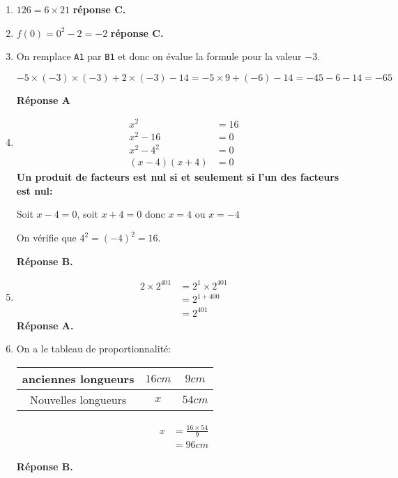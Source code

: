 
\begin{enumerate}
	\item  $126 = 6 \times 21$ \textbf{réponse C.}
	
	
	\item $f(0) = 0^2 - 2= - 2$ \textbf{réponse C.}
	
	\item On remplace \texttt{A1} par \texttt{B1} et donc on évalue la formule pour la valeur $ -3$.
	
	$-5\times (-3) \times (-3)+2 \times (-3)-14=-5 \times 9+(-6)-14=- 45 - 6-14=-65$
	
	\textbf{Réponse A}
	
	\item \begin{align*}
	x^2&=16\\
	x^2-16&=0\\
	x^2-4^2&=0\\
	(x-4)(x+4)&=0
	\end{align*}
	\textbf{Un produit de facteurs est nul si et seulement si l'un des facteurs est nul:}
	
	Soit $x-4=0$, soit $x+4=0$ donc $x=4$ ou $x=-4$
	
	On vérifie que $4^2=(-4)^2=16$.
	
	\textbf{Réponse B.}
	
	\item \begin{align*}
	2 \times 2^401&=2^1 \times 2^401\\
	&=2^{1+400}\\
	&=2^{401}
	\end{align*}
	\textbf{Réponse A.}
	
	\item 
	\begin{minipage}{0.5 \linewidth}
	On a le tableau de proportionnalité:
	
	\begin{tabular}{|c|c|c|}
	\hline 
	anciennes longueurs & $16 cm$ & $9 cm$ \\ 
	\hline 
	Nouvelles longueurs & $x$ & $54cm$ \\ 
	\hline 
	\end{tabular} 
	\end{minipage}
	\begin{minipage}{0.5 \linewidth}
	\begin{align*}
	x&=\frac{16 \times 54}{9}\\
	&=96 cm
	\end{align*}
	
	\textbf{Réponse B.}
	\end{minipage}
	
	\end{enumerate}


